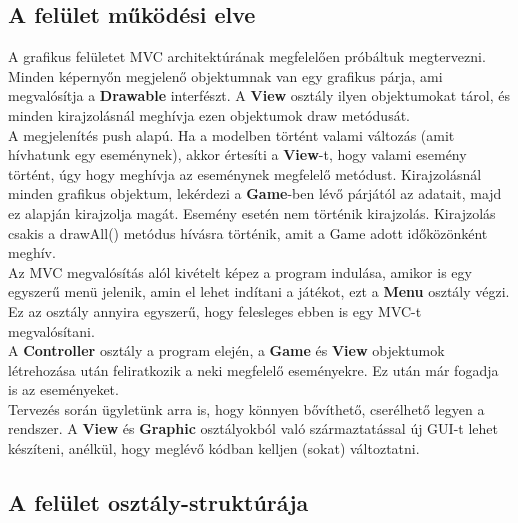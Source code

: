 \subsection{A felület működési elve}
A grafikus felületet MVC architektúrának megfelelően próbáltuk megtervezni. Minden képernyőn megjelenő objektumnak van egy grafikus párja, ami megvalósítja a \textbf{Drawable} interfészt. A \textbf{View} osztály ilyen objektumokat tárol, és minden kirajzolásnál meghívja ezen objektumok draw metódusát. \\
A megjelenítés push alapú. Ha a modelben történt valami változás (amit hívhatunk egy eseménynek), akkor értesíti a \textbf{View}-t, hogy valami esemény történt, úgy hogy meghívja az eseménynek megfelelő metódust. Kirajzolásnál minden grafikus objektum, lekérdezi a \textbf{Game}-ben lévő párjától az adatait, majd ez alapján kirajzolja magát. Esemény esetén nem történik kirajzolás. Kirajzolás csakis a drawAll() metódus hívásra történik, amit a Game adott időközönként meghív.\\
Az MVC megvalósítás alól kivételt képez a program indulása, amikor is egy egyszerű menü jelenik, amin el lehet indítani a játékot, ezt a \textbf{Menu} osztály végzi. Ez az osztály annyira egyszerű, hogy felesleges ebben is egy MVC-t megvalósítani.\\
A \textbf{Controller} osztály a program elején, a \textbf{Game} és \textbf{View} objektumok létrehozása után feliratkozik a neki megfelelő eseményekre. Ez után már fogadja is az eseményeket.\\
Tervezés során ügyletünk arra is, hogy könnyen bővíthető, cserélhető legyen a rendszer. A \textbf{View} és \textbf{Graphic} osztályokból való származtatással új GUI-t lehet készíteni, anélkül, hogy meglévő kódban kelljen (sokat) változtatni.

\subsection{A felület osztály-struktúrája}

